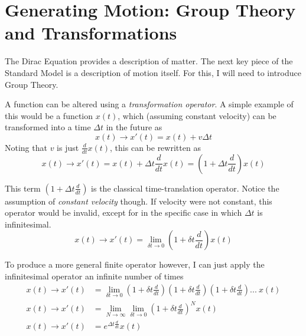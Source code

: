 \section{Generating Motion: Group Theory and Transformations}

    The Dirac Equation provides a description of matter.
    The next key piece of the Standard Model is a description of motion itself.
    For this, I will need to introduce Group Theory.

    A function can be altered using a \textit{transformation operator}.
    A simple example of this would be a function $x(t)$, 
        which (assuming constant velocity) can be transformed into a time $\Delta t$ in the future as
    \begin{equation}
    x(t) \rightarrow x'(t) = x(t) + v \Delta t
    \end{equation}
    Noting that $v$ is just $\frac{d}{dt} x(t)$, this can be rewritten as
    \begin{equation}
    x(t) \rightarrow x'(t) = x(t) + \Delta t \frac{d}{dt} x(t) = \left(1+\Delta t \frac{d}{dt}\right) x(t)
    \end{equation}

    This term $\left(1+\Delta t \frac{d}{dt}\right)$ is the classical time-translation operator.
    Notice the assumption of \textit{constant velocity} though.
    If velocity were not constant, this operator would be invalid, except for in the specific case in which $\Delta t$ is infinitesimal.
    \begin{equation}
    x(t) \rightarrow x'(t) = \lim_{\delta t \to 0} \left(1+\delta t \frac{d}{dt}\right) x(t)
    \end{equation}

    To produce a more general finite operator however, I can just apply the infinitesimal operator an infinite number of times
    \begin{equation} \begin{split}
    x(t) \rightarrow x'(t) &= \lim_{\delta t \to 0} \left(1+\delta t \frac{d}{dt}\right)\left(1+\delta t \frac{d}{dt}\right)\left(1+\delta t \frac{d}{dt}\right)...\ x(t)
    \\x(t) \rightarrow x'(t) &= \lim_{N \to \infty} \lim_{\delta t \to 0} \left(1+\delta t \frac{d}{dt}\right)^N x(t)
    \\x(t) \rightarrow x'(t) &= e^{\Delta t \frac{d}{dt}} x(t)
    \end{split} \end{equation}

